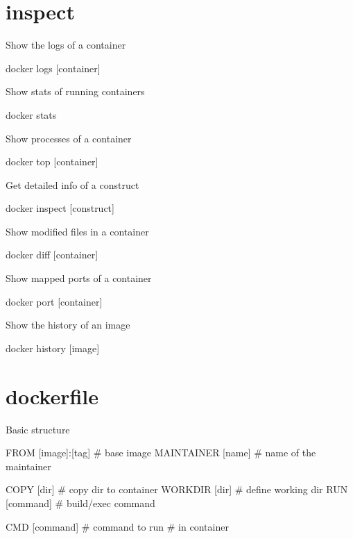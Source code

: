\documentclass{refcard}
\begin{document}
\section{inspect}

Show the logs of a container
\begin{ttyenv}
docker logs [container]
\end{ttyenv}

Show stats of running containers
\begin{ttyenv}
docker stats
\end{ttyenv}

Show processes of a container
\begin{ttyenv}
docker top [container]
\end{ttyenv}

Get detailed info of a construct
\begin{ttyenv}
docker inspect [construct]
\end{ttyenv}

Show modified files in a container
\begin{ttyenv}
docker diff [container]
\end{ttyenv}

Show mapped ports of a container
\begin{ttyenv}
docker port [container]
\end{ttyenv}

Show the history of an image
\begin{ttyenv}
docker history [image]
\end{ttyenv}

\clearpage
\newpage


\section{dockerfile}

Basic structure
\begin{filenv}[language=docker]
FROM [image]:[tag]  # base image
MAINTAINER [name]   # name of the maintainer

COPY [dir]          # copy dir to container
WORKDIR [dir]       # define working dir
RUN [command]       # build/exec command

CMD [command]       # command to run 
                    # in container
\end{filenv}
\end{document}
